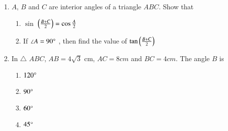 \begin{enumerate}
\hfill{}

\item $A$, $B$ and $C$ are interior angles of a triangle $ABC$. Show that
\begin{enumerate}
\item  $\sin$ $ \left({\frac {B+C}{2}}\right) = \cos {\frac {A}{2}}$
\item  If $\angle A = 90 \degree$ , then find the value of $\tan \left({\frac{B+C}{2}}\right)$ 
\end{enumerate} 

\hfill{}	\item In $\triangle$ $ABC$, $AB = {4\sqrt{3}}$ cm, $AC = 8 cm$ and $BC = 4 cm$. The angle $B$ is
				\begin{enumerate}
\item $120\degree$
\item $90\degree$
\item $60\degree$
\item $45\degree$
				\end{enumerate}
	\hfill{}

\end{enumerate}
